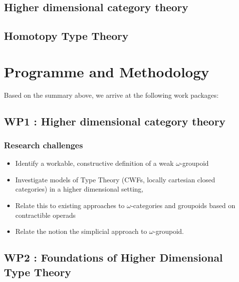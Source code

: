 \documentclass[a4paper]{article}
\begin{document}


\subsection{Higher dimensional category theory}
\label{sec:high-dimens-categ}

\subsection{Homotopy Type Theory}
\label{sec:homotopy-type-theory}


\section{Programme and Methodology}




Based on the summary above, we arrive at the following work packages:

\subsection*{WP1 : Higher dimensional category theory}
\label{sec:wp:qio}

\subsubsection*{Research challenges}
\label{sec:rsearch-challenges}
\begin{itemize}
\item Identify a workable, constructive definition of a weak
$\omega$-groupoid

\item Investigate models of Type Theory (CWFs, locally cartesian
  closed categories) in a higher dimensional setting,
\item Relate this to existing approaches to $\omega$-categories and
  groupoids based on contractible operads
\item Relate the notion the simplicial approach to $\omega$-groupoid.
\end{itemize}


\subsection*{WP2 : Foundations of Higher Dimensional Type Theory}
\end{document}
